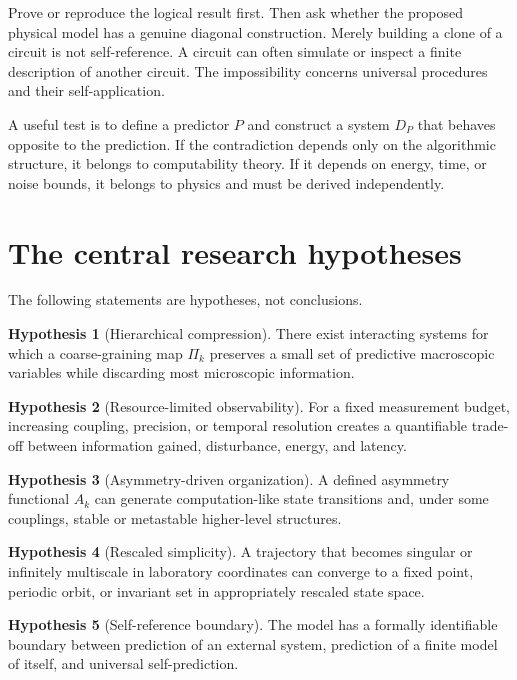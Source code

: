 \documentclass[11pt]{article}
\newcommand{\Coarse}{\Pi}
\theoremstyle{definition}
\newtheorem{hypothesis}{Hypothesis}
\theoremstyle{plain}
\theoremstyle{remark}
\begin{document}
Prove or reproduce the logical result first. Then ask whether the proposed physical model has a genuine diagonal construction. Merely building a clone of a circuit is not self-reference. A circuit can often simulate or inspect a finite description of another circuit. The impossibility concerns universal procedures and their self-application.

A useful test is to define a predictor $P$ and construct a system $D_P$ that behaves opposite to the prediction. If the contradiction depends only on the algorithmic structure, it belongs to computability theory. If it depends on energy, time, or noise bounds, it belongs to physics and must be derived independently.

\section{The central research hypotheses}

The following statements are hypotheses, not conclusions.

\begin{hypothesis}[Hierarchical compression]\label{hyp:H1}
There exist interacting systems for which a coarse-graining map $\Coarse_k$ preserves a small set of predictive macroscopic variables while discarding most microscopic information.
\end{hypothesis}

\begin{hypothesis}[Resource-limited observability]\label{hyp:H2}
For a fixed measurement budget, increasing coupling, precision, or temporal resolution creates a quantifiable trade-off between information gained, disturbance, energy, and latency.
\end{hypothesis}

\begin{hypothesis}[Asymmetry-driven organization]\label{hyp:H3}
A defined asymmetry functional $A_k$ can generate computation-like state transitions and, under some couplings, stable or metastable higher-level structures.
\end{hypothesis}

\begin{hypothesis}[Rescaled simplicity]\label{hyp:H4}
A trajectory that becomes singular or infinitely multiscale in laboratory coordinates can converge to a fixed point, periodic orbit, or invariant set in appropriately rescaled state space.
\end{hypothesis}

\begin{hypothesis}[Self-reference boundary]\label{hyp:H5}
The model has a formally identifiable boundary between prediction of an external system, prediction of a finite model of itself, and universal self-prediction.
\end{hypothesis}
\end{document}
